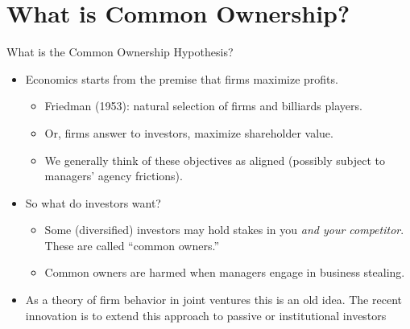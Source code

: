 \documentclass[handout, serif, aspectratio=169, 10pt]{beamer}
\begin{document}



\section{What is Common Ownership?}

\begin{frame}[plain]{What is the Common Ownership Hypothesis?}
\begin{itemize}
\item Economics starts from the premise that firms maximize profits.
\begin{itemize}
\item Friedman (1953): natural selection of firms and billiards players.
\item Or, firms answer to investors, \alert{maximize shareholder value}.
\item We generally think of these objectives as aligned (possibly subject to managers' agency frictions).
\end{itemize}
\item So what do investors want?
\begin{itemize}
\item Some (diversified) investors may hold stakes in you \textit{and your competitor}. These are called ``common owners.''
\item Common owners are harmed when managers engage in \alert{business stealing}.
\end{itemize}
\item As a theory of firm behavior in \alert{joint ventures} this is an old idea. The recent innovation is to extend this approach to \alert{passive or institutional investors}
\end{itemize}
\end{frame}
\end{document}
